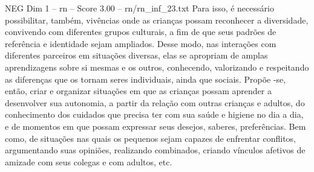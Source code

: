 \begin{textsample}{NEG Dim 1 – rn – Score 3.00 – rn/rn\_inf\_23.txt}
Para isso, é necessário possibilitar, também, vivências onde as crianças possam reconhecer a diversidade, convivendo com diferentes grupos culturais, a fim de que seus padrões de referência e identidade sejam ampliados.
Desse modo, nas interações com diferentes parceiros em situações diversas, elas se apropriam de amplas aprendizagens sobre si mesmas e os outros, conhecendo, valorizando e respeitando as diferenças que os tornam seres individuais, ainda que sociais.
Propõe -se, então, criar e organizar situações em que as crianças possam aprender a desenvolver sua autonomia, a partir da relação com outras crianças e adultos, do conhecimento dos cuidados que precisa ter com sua saúde e higiene no dia a dia, e de momentos em que possam expressar seus desejos, saberes, preferências.
Bem como, de situações nas quais os pequenos sejam capazes de enfrentar conflitos, argumentando suas opiniões, realizando combinados, criando vínculos afetivos de amizade com seus colegas e com adultos, etc.

\end{textsample}

